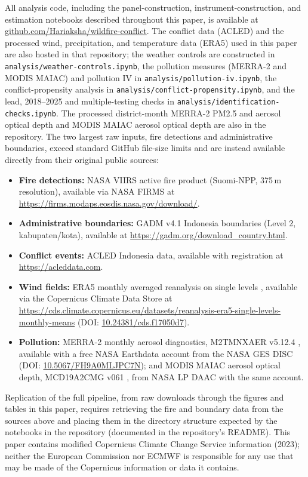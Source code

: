 \documentclass[12pt]{article}
\begin{document}
All analysis code, including the panel-construction, instrument-construction, and estimation notebooks described throughout this paper, is available at \href{https://github.com/Hariaksha/wildfire-conflict}{github.com/Hariaksha/wildfire-conflict}. The conflict data (ACLED) and the processed wind, precipitation, and temperature data (ERA5) used in this paper are also hosted in that repository; the weather controls are constructed in \texttt{analysis/weather-controls.ipynb}, the pollution measures (MERRA-2 and MODIS MAIAC) and pollution IV in \texttt{analysis/pollution-iv.ipynb}, the conflict-propensity analysis in \texttt{analysis/conflict-propensity.ipynb}, and the lead, 2018--2025 and multiple-testing checks in \texttt{analysis/identification-checks.ipynb}. The processed district-month MERRA-2 PM2.5 and aerosol optical depth and MODIS MAIAC aerosol optical depth are also in the repository. The two largest raw inputs, fire detections and administrative boundaries, exceed standard GitHub file-size limits and are instead available directly from their original public sources:
\begin{itemize}
    \item \textbf{Fire detections:} NASA VIIRS active fire product (Suomi-NPP, 375\,m resolution), available via NASA FIRMS at \url{https://firms.modaps.eosdis.nasa.gov/download/}.
    \item \textbf{Administrative boundaries:} GADM v4.1 Indonesia boundaries (Level 2, kabupaten/kota), available at \url{https://gadm.org/download_country.html}.
    \item \textbf{Conflict events:} ACLED Indonesia data, available with registration at \url{https://acleddata.com}.
    \item \textbf{Wind fields:} ERA5 monthly averaged reanalysis on single levels \citep{hersbach2023era5}, available via the Copernicus Climate Data Store at \url{https://cds.climate.copernicus.eu/datasets/reanalysis-era5-single-levels-monthly-means} (DOI: \href{https://doi.org/10.24381/cds.f17050d7}{10.24381/cds.f17050d7}).
    \item \textbf{Pollution:} MERRA-2 monthly aerosol diagnostics, M2TMNXAER v5.12.4 \citep{gelaro2017merra}, available with a free NASA Earthdata account from the NASA GES DISC (DOI: \href{https://doi.org/10.5067/FH9A0MLJPC7N}{10.5067/FH9A0MLJPC7N}); and MODIS MAIAC aerosol optical depth, MCD19A2CMG v061 \citep{lyapustin2018maiac}, from NASA LP DAAC with the same account.
\end{itemize}
Replication of the full pipeline, from raw downloads through the figures and tables in this paper, requires retrieving the fire and boundary data from the sources above and placing them in the directory structure expected by the notebooks in the repository (documented in the repository's README). This paper contains modified Copernicus Climate Change Service information (2023); neither the European Commission nor ECMWF is responsible for any use that may be made of the Copernicus information or data it contains.
\end{document}
